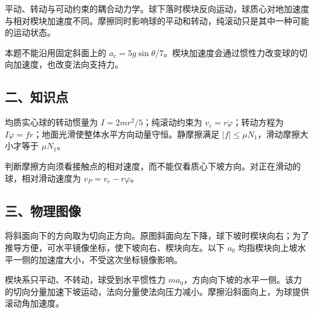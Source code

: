 \documentclass[12pt,a4paper,fontset=fandol]{ctexart}
\begin{document}
平动、转动与可动约束的耦合动力学。球下落时楔块反向运动，球质心对地加速度与相对楔块加速度不同。摩擦同时影响球的平动和转动，纯滚动只是其中一种可能的运动状态。

本题不能沿用固定斜面上的
\(a_c=5g\sin\theta/7\)。楔块加速度会通过惯性力改变球的切向加速度，也改变法向支持力。

\subsection{二、知识点}\label{ux4e8cux77e5ux8bc6ux70b9-2}

均质实心球的转动惯量为 \(I=2mr^2/5\)；纯滚动约束为
\(v_c=r\dot\varphi\)；转动方程为
\(I\ddot\varphi=fr\)；地面光滑使整体水平方向动量守恒。静摩擦满足
\(|f|\le\mu N_1\)，滑动摩擦大小才等于 \(\mu N_1\)。

判断摩擦方向须看接触点的相对速度，而不能仅看质心下坡方向。对正在滑动的球，相对滑动速度为
\(v_P=v_c-r\dot\varphi\)。

\subsection{三、物理图像}\label{ux4e09ux7269ux7406ux56feux50cf-2}

将斜面向下的方向取为切向正方向。原图斜面向左下降，球下坡时楔块向右；为了推导方便，可水平镜像坐标，使下坡向右、楔块向左。以下
\(a_0\) 均指楔块向上坡水平一侧的加速度大小，不受这次坐标镜像影响。

楔块系只平动、不转动，球受到水平惯性力
\(ma_0\)，方向向下坡的水平一侧。该力的切向分量加速下坡运动，法向分量使法向压力减小。摩擦沿斜面向上，为球提供滚动角加速度。

\begin{center}
\begin{minipage}{\linewidth}
\centering\begingroup{}
\ifdim\wd\diagrambox>.88\linewidth
\sbox{\diagrambox}{\resizebox{.88\linewidth}{!}{\usebox{\diagrambox}}}\fi
\ifdim\ht\diagrambox>.38\textheight
\resizebox{!}{.38\textheight}{\usebox{\diagrambox}}
\else\usebox{\diagrambox}\fi
\par{}\endgroup\end{minipage}\end{center}
\end{document}
